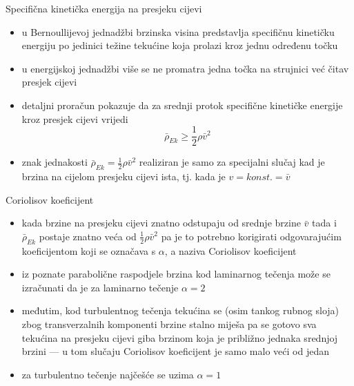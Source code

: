 \documentclass[croatian]{beamer}
\begin{document}
\begin{frame}{Specifična kinetička energija na presjeku cijevi}

\begin{itemize}
\item u Bernoullijevoj jednadžbi brzinska visina predstavlja specifičnu
kinetičku energiju po jedinici težine tekućine koja prolazi kroz jednu
određenu točku
\item u energijskoj jednadžbi više se ne promatra jedna točka na strujnici
već čitav presjek cijevi
\item detaljni proračun pokazuje da za srednji protok specifične kinetičke
energije kroz presjek cijevi vrijedi
\[
\bar{\rho}_{Ek}\geq\frac{1}{2}\rho\bar{v}^{2}
\]
\item znak jednakosti $\bar{\rho}_{Ek}=\frac{1}{2}\rho\bar{v}^{2}$ realiziran
je samo za specijalni slučaj kad je brzina na cijelom presjeku cijevi
ista, tj. kada je $v=konst.=\bar{v}$
\end{itemize}
\end{frame}

\begin{frame}{Coriolisov koeficijent}

\begin{itemize}
\item kada brzine na presjeku cijevi znatno odstupaju od srednje brzine
$\bar{v}$ tada i $\bar{\rho}_{Ek}$ postaje znatno veća od $\frac{1}{2}\rho\bar{v}^{2}$
pa je to potrebno korigirati odgovarajućim koeficijentom koji se označava
s $\alpha$, a naziva \alert{Coriolisov koeficijent}
\item iz poznate parabolične raspodjele brzina kod laminarnog
tečenja može se izračunati da je za laminarno tečenje $\alpha=2$
\item međutim, kod turbulentnog tečenja tekućina se (osim tankog rubnog
sloja) zbog transverzalnih komponenti brzine stalno miješa pa se gotovo
sva tekućina na presjeku cijevi giba brzinom koja je približno jednaka
srednjoj brzini --- u tom slučaju Coriolisov koeficijent je samo
malo veći od jedan
\end{itemize}
\begin{block}{}

\begin{itemize}
\item za turbulentno tečenje najčešće se uzima $\alpha=1$
\end{itemize}
\end{block}
\end{frame}
\end{document}
